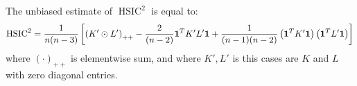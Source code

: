 \begin{proposition}
    The unbiased estimate of $\operatorname{HSIC}^2$ is equal to:
    \begin{equation*}
        \operatorname{HSIC}^2 = \frac{1}{n(n-3)}\left[ \left( {K'}\odot{L'} \right)_{++} - \frac{2}{(n-2)}\boldsymbol1^T{K'}{L'}\boldsymbol1 + \frac{1}{(n-1)(n-2)}\left( \boldsymbol1^T{K'}\boldsymbol1 \right)\left( \boldsymbol1^T{L'}\boldsymbol1 \right)  \right]
    \end{equation*}
    where $(\cdot)_{++}$ is elementwise sum, and where $K', L'$ is this cases are $K$ and $L$ with zero diagonal entries.
\end{proposition}


